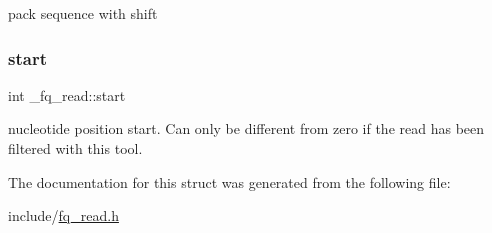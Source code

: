 pack sequence with shift \mbox{\label{struct__fq__read_a0b8deb6c25c72026b4928b17e3f12ade}} 
\subsubsection{\texorpdfstring{start}{start}}
{\footnotesize\ttfamily int \+\_\+fq\+\_\+read\+::start}

nucleotide position start. Can only be different from zero if the read has been filtered with this tool. 

The documentation for this struct was generated from the following file\+:\begin{DoxyCompactItemize}
\item 
include/\mbox{\hyperlink{fq__read_8h}{fq\+\_\+read.\+h}}\end{DoxyCompactItemize}
